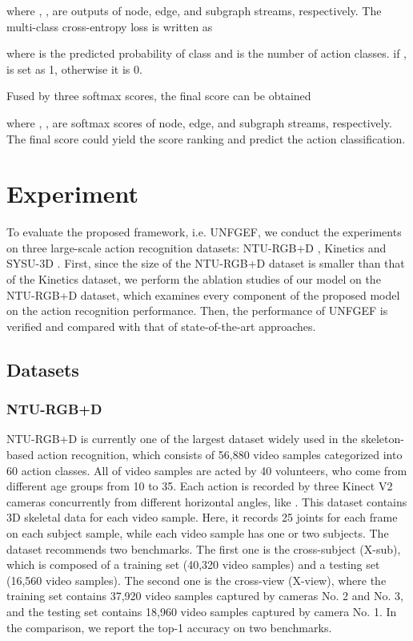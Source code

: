 \documentclass[journal]{IEEEtran}
\begin{document}
where , ,  are outputs of node, edge, and subgraph streams, respectively. The multi-class cross-entropy loss is written as

where  is the predicted probability of class  and  is the number of action classes. if  ,  is set as 1, otherwise it is 0.

Fused by three softmax scores, the final score can be obtained

where , ,  are softmax scores of node, edge, and subgraph streams, respectively. The final score could yield the score ranking and predict the action classification.

\section{Experiment}
To evaluate the proposed framework, i.e. UNFGEF, we conduct the experiments on three large-scale action recognition datasets: NTU-RGB+D \cite{Shahroudy_2016_NTURGBD}, Kinetics \cite{kay2017kinetics} and SYSU-3D \cite{hu2015jointly}. First, since the size of the NTU-RGB+D dataset is smaller than that of the Kinetics dataset, we perform the ablation studies of our model on the NTU-RGB+D dataset, which examines every component of the proposed model on the action recognition performance. Then, the performance of UNFGEF is verified and compared with that of state-of-the-art approaches.

\subsection{Datasets}
\subsubsection{NTU-RGB+D} NTU-RGB+D is currently one of the largest dataset widely used in the skeleton-based action recognition, which consists of 56,880 video samples categorized into 60 action classes. All of video samples are acted by 40 volunteers, who come from different age groups from 10 to 35. Each action is recorded by three Kinect V2 cameras concurrently from different horizontal angles, like . This dataset contains 3D skeletal data for each video sample. Here, it records 25 joints for each frame on each subject sample, while each video sample has one or two subjects. The dataset recommends two benchmarks. The first one is the cross-subject (X-sub), which is composed of a training set (40,320 video samples) and a testing set (16,560 video samples). The second one is the cross-view (X-view), where the training set contains 37,920 video samples captured by cameras No. 2 and No. 3, and the testing set contains 18,960 video samples captured by camera No. 1. In the comparison, we report the top-1 accuracy on two benchmarks.
\end{document}

